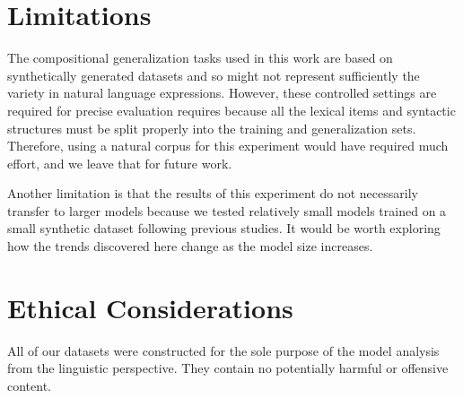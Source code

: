\section*{Limitations}
The compositional generalization tasks used in this work are based on synthetically generated datasets and so might not represent sufficiently the variety in natural language expressions.
However, these controlled settings are required for precise evaluation requires because all the lexical items and syntactic structures must be split properly into the training and generalization sets.
Therefore, using a natural corpus for this experiment would have required much effort, and we leave that for future work.

Another limitation is that the results of this experiment do not necessarily transfer to larger models because we tested relatively small models trained on a small synthetic dataset following previous studies.
It would be worth exploring how the trends discovered here change as the model size increases.


\section*{Ethical Considerations}
All of our datasets were constructed for the sole purpose of the model analysis from the linguistic perspective.
They contain no potentially harmful or offensive content.